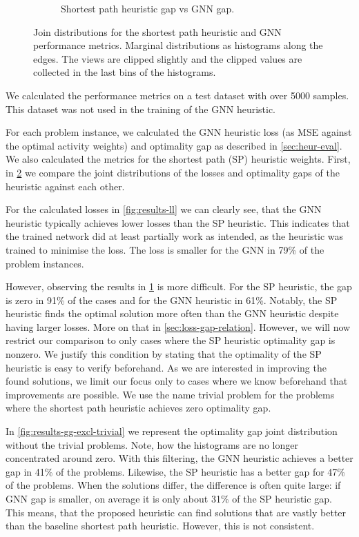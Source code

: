 \documentclass[english, 12pt, a4paper, sci, utf8, a-2b, online]{aaltothesis}
\begin{document}
\begin{figure}
\begin{subfigure}{0.5\textwidth}
        \caption{Shortest path heuristic gap vs GNN gap.}
        \label{fig:results-gg}
    \end{subfigure}
    \caption{Join distributions for the shortest path heuristic and GNN performance metrics. Marginal distributions as histograms along the edges. The views are clipped slightly and the clipped values are collected in the last bins of the histograms.}
    \label{fig:results-ll-gg}
\end{figure}

We calculated the performance metrics on a test dataset with over 5000 samples. This dataset was not used in the training of the GNN heuristic.

For each problem instance, we calculated the GNN heuristic loss (as MSE against the optimal activity weights) and optimality gap as described in \cref{sec:heur-eval}. We also calculated the metrics for the shortest path (SP) heuristic weights. First, in \cref{fig:results-ll-gg} we compare the joint distributions of the losses and optimality gaps of the heuristic against each other.

For the calculated losses in \cref{fig:results-ll} we can clearly see, that the GNN heuristic typically achieves lower losses than the SP heuristic. This indicates that the trained network did at least partially work as intended, as the heuristic was trained to minimise the loss. The loss is smaller for the GNN in 79\% of the problem instances.

However, observing the results in \cref{fig:results-gg} is more difficult. For the SP heuristic, the gap is zero in 91\% of the cases and for the GNN heuristic in 61\%. Notably, the SP heuristic finds the optimal solution more often than the GNN heuristic despite having larger losses. More on that in \cref{sec:loss-gap-relation}. However, we will now restrict our comparison to only cases where the SP heuristic optimality gap is nonzero. We justify this condition by stating that the optimality of the SP heuristic is easy to verify beforehand. As we are interested in improving the found solutions, we limit our focus only to cases where we know beforehand that improvements are possible. We use the name trivial problem for the problems where the shortest path heuristic achieves zero optimality gap.

In \cref{fig:results-gg-excl-trivial} we represent the optimality gap joint distribution without the trivial problems. Note, how the histograms are no longer concentrated around zero. With this filtering, the GNN heuristic achieves a better gap in 41\% of the problems. Likewise, the SP heuristic has a better gap for 47\% of the problems. When the solutions differ, the difference is often quite large: if GNN gap is smaller, on average it is only about 31\% of the SP heuristic gap. This means, that the proposed heuristic can find solutions that are vastly better than the baseline shortest path heuristic. However, this is not consistent.
\end{document}
